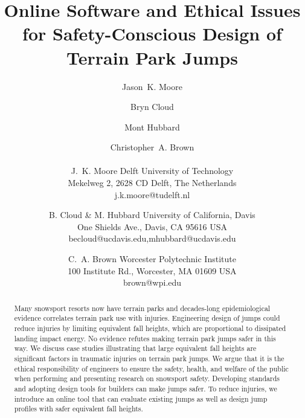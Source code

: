 \documentclass{article}
\begin{document}
\title{Online Software and Ethical Issues for Safety-Conscious Design of Terrain Park Jumps}

\author{
  Jason~K. Moore \and
  Bryn Cloud \and
  Mont Hubbard \and
  Christopher~A. Brown \\\\
  J.~K. Moore
  Delft University of Technology\\
  Mekelweg 2, 2628 CD Delft, The Netherlands\\
  j.k.moore@tudelft.nl
  \and
  B. Cloud \& M. Hubbard
  University of California, Davis\\
  One Shields Ave., Davis, CA 95616 USA\\
  becloud@ucdavis.edu,mhubbard@ucdavis.edu
  \and
  C.~A. Brown
  Worcester Polytechnic Institute\\
  100 Institute Rd., Worcester, MA 01609 USA\\
  brown@wpi.edu
}

\maketitle

\begin{abstract}
  Many snowsport resorts now have terrain parks and decades-long
  epidemiological evidence correlates terrain park use with injuries.
  Engineering design of jumps could reduce injuries by limiting equivalent fall
  heights, which are proportional to dissipated landing impact energy.  No
  evidence refutes making terrain park jumps safer in this way. We discuss case
  studies illustrating that large equivalent fall heights are significant
  factors in traumatic injuries on terrain park jumps. We argue that it is the
  ethical responsibility of engineers to ensure the safety, health, and welfare
  of the public when performing and presenting research on snowsport safety.
  Developing standards and adopting design tools for builders can make jumps
  safer. To reduce injuries, we introduce an online tool that can evaluate
  existing jumps as well as design jump profiles with safer equivalent fall
  heights.
\end{abstract}
\end{document}
